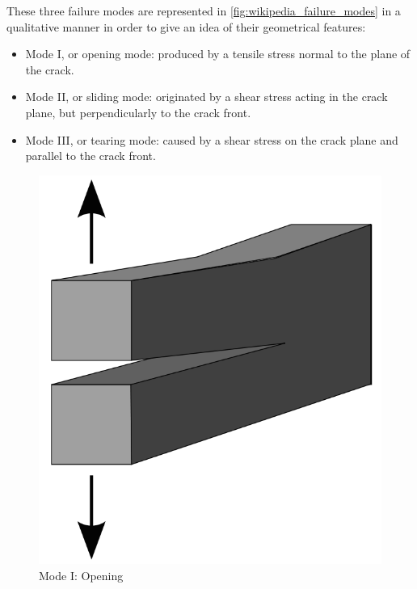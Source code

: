 \documentclass[
documentsize = a4, %
font = cmr, %
typesize = 11, %
printmode = true,
onehalfspacing = true,
language = en, %
titlepage = udciccp, %
degree = pt, %
dedication = true,
acknowledgements = true,
abstract-en = true,
abstract-es = false,
abstract-ga = false,
epigraphs = true,
toc = true,
lof = true,
lot = true,
frontmatterintoc = false,
notation = false,
minimal = false,
]{UDCthesis}
\begin{document}
These three failure modes are represented in \cref{fig:wikipedia_failure_modes} in a qualitative manner in order to give an idea of their geometrical features:
\begin{itemize}
	\item Mode I, or opening mode: produced by a tensile stress normal to the plane of the crack.

	\item Mode II, or sliding mode: originated by a shear stress acting in the crack plane, but perpendicularly to the crack front.

	\item Mode III, or tearing mode: caused by a shear stress on the crack plane and parallel to the crack front.
\end{itemize}

\begin{figure}
\centering
\begin{minipage}[b]{.3\columnwidth}
	\centering
	\includegraphics[width=\columnwidth]{IMG_CUTRES/wikipedia_failure_modes_1}
			Mode I:	Opening
\end{minipage}
\hfill
\begin{minipage}[b]{.3\columnwidth}

\end{minipage}
\end{figure}
\end{document}
